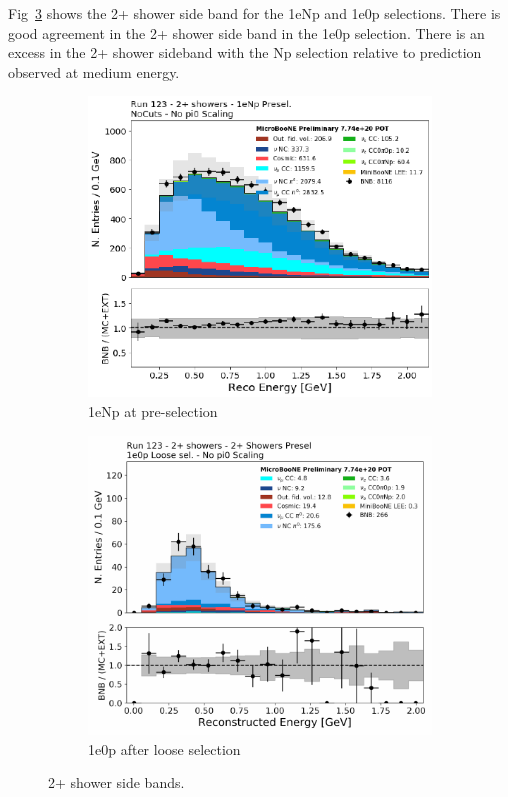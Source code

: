 Fig~\ref{fig:fakedata:set3:2shr} shows the 2+ shower side band for the 1eNp and 1e0p selections. There is good agreement in the 2+ shower side band in the 1e0p selection.  There is an excess in the 2+ shower sideband with the Np selection relative to prediction observed at medium energy.  

\begin{figure}[H] 
\begin{center}
    \begin{subfigure}[b]{0.45\textwidth}
    \centering
    \includegraphics[width=1.00\textwidth]{Fakedata/set3/np_2shr.pdf}
    \caption{\label{fig:fakedata:set3:2shrnp} 1eNp at pre-selection}
    \end{subfigure}
    \begin{subfigure}[b]{0.45\textwidth}
    \centering
    \includegraphics[width=1.00\textwidth]{Fakedata/set3/zp_2shr.pdf}
    \caption{\label{fig:fakedata:set3:2shr0p} 1e0p after loose selection}
    \end{subfigure}
\caption{\label{fig:fakedata:set3:2shr} 2+ shower side bands.}
\end{center}
\end{figure}

